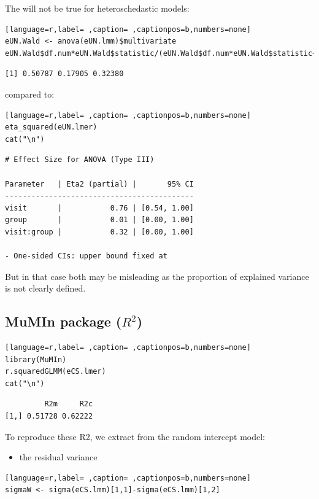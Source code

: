 \documentclass[12pt]{article}
\begin{document}
The will not be true for heteroschedastic models:
\begin{lstlisting}[language=r,label= ,caption= ,captionpos=b,numbers=none]
eUN.Wald <- anova(eUN.lmm)$multivariate
eUN.Wald$df.num*eUN.Wald$statistic/(eUN.Wald$df.num*eUN.Wald$statistic+eUN.Wald$df.denom)
\end{lstlisting}

\begin{verbatim}
[1] 0.50787 0.17905 0.32380
\end{verbatim}


compared to:
\begin{lstlisting}[language=r,label= ,caption= ,captionpos=b,numbers=none]
eta_squared(eUN.lmer)
cat("\n")
\end{lstlisting}

\begin{verbatim}
# Effect Size for ANOVA (Type III)

Parameter   | Eta2 (partial) |       95% CI
-------------------------------------------
visit       |           0.76 | [0.54, 1.00]
group       |           0.01 | [0.00, 1.00]
visit:group |           0.32 | [0.00, 1.00]

- One-sided CIs: upper bound fixed at
\end{verbatim}


But in that case both may be misleading as the proportion of explained
variance is not clearly defined.

\subsection{MuMIn package (\(R^2\))}
\label{sec:org0f6ce66}

\begin{lstlisting}[language=r,label= ,caption= ,captionpos=b,numbers=none]
library(MuMIn)
r.squaredGLMM(eCS.lmer)
cat("\n")
\end{lstlisting}

\begin{verbatim}
         R2m     R2c
[1,] 0.51728 0.62222
\end{verbatim}


To reproduce these R2, we extract from the random intercept model:
\begin{itemize}
\item the residual variance
\end{itemize}
\begin{lstlisting}[language=r,label= ,caption= ,captionpos=b,numbers=none]
sigmaW <- sigma(eCS.lmm)[1,1]-sigma(eCS.lmm)[1,2]
\end{lstlisting}
\end{document}
